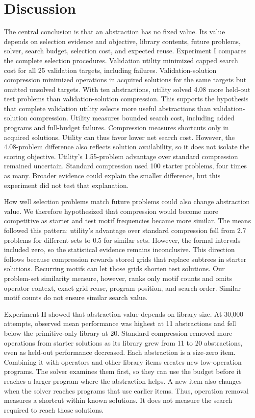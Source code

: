 \documentclass[10pt]{article}
\begin{document}
\FloatBarrier

\section{Discussion}

The central conclusion is that an abstraction has no fixed value. Its value
depends on selection evidence and objective, library contents, future problems,
solver, search budget, selection cost, and expected reuse.
Experiment I compares the complete selection procedures. Validation utility minimized capped search
cost for all 25 validation targets, including failures. Validation-solution
compression minimized operations in acquired solutions for the same targets
but omitted unsolved targets. With ten abstractions, utility solved 4.08 more held-out
test problems than validation-solution compression. This supports the
hypothesis that complete validation utility selects more useful abstractions
than validation-solution compression. Utility measures bounded search cost,
including added programs and full-budget failures. Compression measures
shortcuts only in acquired solutions. Utility can thus favor lower net search
cost. However, the 4.08-problem difference also reflects solution availability,
so it does not isolate the scoring objective. Utility's
1.55-problem advantage over standard compression remained uncertain. Standard
compression used 100 starter problems, four times as many.
Broader evidence could
explain the smaller difference, but this experiment did not test that
explanation.

How well selection problems match future problems could also change abstraction
value. We therefore hypothesized that compression would become more
competitive as starter and test motif frequencies became more similar. The
means followed this pattern: utility's advantage over standard compression fell
from 2.7 problems for different sets to 0.5 for similar sets. However, the
formal intervals included zero, so the statistical evidence remains
inconclusive. This direction follows because compression rewards stored grids
that replace subtrees in starter solutions.
Recurring motifs can let those grids shorten test solutions. Our problem-set
similarity measure, however, ranks only motif counts and omits operator context,
exact grid reuse, program position, and search order. Similar motif counts do
not ensure similar search value.

Experiment II showed that abstraction value depends on library size. At 30,000
attempts, observed mean performance was highest at 11
abstractions and fell below the primitive-only library at 20. Standard
compression removed more operations from starter solutions as its library grew
from 11 to 20 abstractions, even as held-out performance decreased. Each
abstraction is a size-zero item. Combining it with operators and other library
items creates new low-operation programs. The solver examines them first, so
they can use the budget before it reaches a larger program where the
abstraction helps. A new
item also changes when the solver reaches programs that use earlier items.
Thus, operation removal measures a shortcut within known solutions. It does not
measure the search required to reach those solutions.
\end{document}
